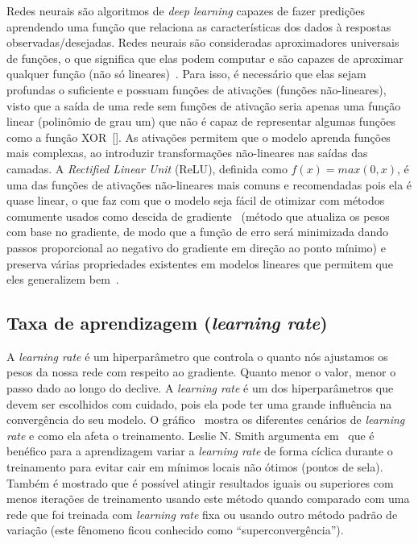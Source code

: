 Redes neurais são algoritmos de \textit{deep learning} capazes de fazer predições aprendendo uma função que relaciona as características dos dados à respostas observadas/desejadas. Redes neurais são consideradas aproximadores universais de funções, o que significa que elas podem computar e são capazes de aproximar qualquer função (não só lineares)~\cite{dlbook}. Para isso, é necessário que elas sejam profundas o suficiente e possuam funções de ativações (funções não-lineares), visto que a saída de uma rede sem funções de ativação seria apenas uma função linear (polinômio de grau um) que não é capaz de representar algumas funções como a função \acrshort{XOR}~[]. As ativações permitem que o modelo aprenda funções mais complexas, ao introduzir transformações não-lineares nas saídas das camadas. A \textit{Rectified Linear Unit} (\acrshort{ReLU}), definida como $f(x) = max(0, x)$, é uma das funções de ativações não-lineares mais comuns e recomendadas pois ela é quase linear, o que faz com que o modelo seja fácil de otimizar com métodos comumente usados como descida de gradiente~\cite{rumelhart1988learning} (método que atualiza os pesos com base no gradiente, de modo que a função de erro será minimizada dando passos proporcional ao negativo do gradiente em direção ao ponto mínimo) e preserva várias propriedades existentes em modelos lineares que permitem que eles generalizem bem~\cite{deeplearning}.

\subsection{Taxa de aprendizagem (\textit{learning rate})}
A \textit{learning rate} é um hiperparâmetro que controla o quanto nós ajustamos os pesos da nossa rede com respeito ao gradiente. Quanto menor o valor, menor o passo dado ao longo do declive. A \textit{learning rate} é um dos hiperparâmetros que devem ser escolhidos com cuidado, pois ela pode ter uma grande influência na convergência do seu modelo. O gráfico~ mostra os diferentes cenários de \textit{learning rate} e como ela afeta o treinamento.
Leslie N. Smith argumenta em~\cite{smith2017cyclical} que é benéfico para a aprendizagem variar a \textit{learning rate} de forma cíclica durante o treinamento para evitar cair em mínimos locais não ótimos (pontos de sela). Também é mostrado que é possível atingir resultados iguais ou superiores com menos iterações de treinamento usando este método quando comparado com uma rede que foi treinada com \textit{learning rate} fixa ou usando outro método padrão de variação (este fênomeno ficou conhecido como ``superconvergência'').

